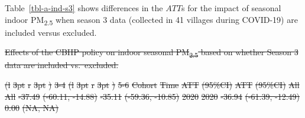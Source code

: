 \documentclass[
  letterpaper,
  DIV=11,
  numbers=noendperiod]{scrartcl}
\makeatletter
\renewenvironment{table}%
   {\renewcommand\familydefault\sfdefault
    \@float{table}}
   {\end@float}
\providecommand{\DIFdel}[1]{{\protect\color{red}\sout{#1}}}                      %
\providecommand{\DIFdelbegin}{} %
\providecommand{\DIFdelFL}[1]{\DIFdel{#1}} %
\newcommand{\DIFscaledelfig}{0.5}
\newlength{\DIFdelgraphicswidth} %
\newlength{\DIFdelgraphicsheight} %
\newcommand{\DIFdelincludegraphics}[2][]{%
\sbox{\DIFdelgraphicsbox}{\DIFOincludegraphics[#1]{#2}}%
\settoboxwidth{\DIFdelgraphicswidth}{\DIFdelgraphicsbox} %
\settoboxtotalheight{\DIFdelgraphicsheight}{\DIFdelgraphicsbox} %
\scalebox{\DIFscaledelfig}{%
\parbox[b]{\DIFdelgraphicswidth}{\usebox{\DIFdelgraphicsbox}\\[-\baselineskip] \rule{\DIFdelgraphicswidth}{0em}}\llap{\resizebox{\DIFdelgraphicswidth}{\DIFdelgraphicsheight}{%
\setlength{\unitlength}{\DIFdelgraphicswidth}%
\begin{picture}(1,1)%
\thicklines\linethickness{2pt} %
{\color[rgb]{1,0,0}\put(0,0){\framebox(1,1){}}}%
{\color[rgb]{1,0,0}\put(0,0){\line( 1,1){1}}}%
{\color[rgb]{1,0,0}\put(0,1){\line(1,-1){1}}}%
\end{picture}%
}\hspace*{3pt}}} %
} %
\DeclareRobustCommand{\DIFdelbegin}{\DIFOdelbegin \let\includegraphics\DIFdelincludegraphics} %
\makeatother
\begin{document}
Table~\ref{tbl-a-ind-s3} shows differences in the \(ATT\)s for the
impact of seasonal indoor PM\textsubscript{2.5} when season 3 data
(collected in 41 villages during COVID-19) are included versus excluded.

\DIFdelbegin %
{%
\DIFdelFL{Effects of the CBHP policy on indoor seasonal PM\textsubscript{2.5}
based on whether Season 3 data are included vs.~excluded. }}%

\DIFdelFL{(l}%
\DIFdelFL{3pt}%
\DIFdelFL{r}%
\DIFdelFL{3pt}%
\DIFdelFL{)}%
\DIFdelFL{3-4}%
\DIFdelFL{(l}%
\DIFdelFL{3pt}%
\DIFdelFL{r}%
\DIFdelFL{3pt}%
\DIFdelFL{)}%
\DIFdelFL{5-6}%
\DIFdelFL{Cohort }%
\DIFdelFL{Time }%
\DIFdelFL{ATT }%
\DIFdelFL{(95\%CI) }%
\DIFdelFL{ATT }%
\DIFdelFL{(95\%CI)}%
\DIFdelFL{All }%
\DIFdelFL{All }%
\DIFdelFL{-37.49 }%
\DIFdelFL{(-60.11, -14.88) }%
\DIFdelFL{-35.11 }%
\DIFdelFL{(-59.36, -10.85)}%
\DIFdelFL{2020 }%
\DIFdelFL{2020 }%
\DIFdelFL{-36.94 }%
\DIFdelFL{(-61.39, -12.49) }%
\DIFdelFL{0.00 }%
\DIFdelFL{(NA, NA)}%
\end{document}
